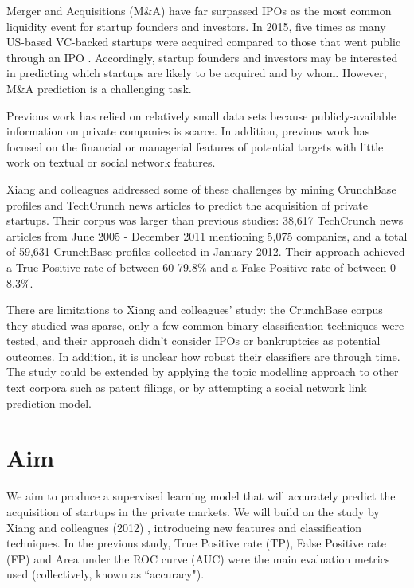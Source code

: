 \documentclass[12pt, a4paper]{article}
\begin{document}
Merger and Acquisitions (M\&A) have far surpassed IPOs as the most common liquidity event for startup founders and investors. In 2015, five times as many US-based VC-backed startups were acquired compared to those that went public through an IPO \cite{nvca2016}. Accordingly, startup founders and investors may be interested in predicting which startups are likely to be acquired and by whom. However, M\&A prediction is a challenging task.

Previous work has relied on relatively small data sets \cite{wei2008} because publicly-available information on private companies is scarce. In addition, previous work has focused on the financial or managerial features of potential targets \cite{hongjiu2007} with little work on textual or social network features.

Xiang and colleagues \cite{xiang2012} addressed some of these challenges by mining CrunchBase profiles and TechCrunch news articles to predict the acquisition of private startups. Their corpus was larger than previous studies: 38,617 TechCrunch news articles from June 2005 - December 2011 mentioning 5,075 companies, and a total of 59,631 CrunchBase profiles collected in January 2012. Their approach achieved a True Positive rate of between 60-79.8\% and a False Positive rate of between 0-8.3\%.

There are limitations to Xiang and colleagues' study: the CrunchBase corpus they studied was sparse, only a few common binary classification techniques were tested, and their approach didn't consider IPOs or bankruptcies as potential outcomes. In addition, it is unclear how robust their classifiers are through time. The study could be extended by applying the topic modelling approach to other text corpora such as patent filings, or by attempting a social network link prediction model.

\section*{Aim}

We aim to produce a supervised learning model that will accurately predict the acquisition of startups in the private markets. We will build on the study by Xiang and colleagues (2012) \cite{xiang2012}, introducing new features and classification techniques. In the previous study, True Positive rate (TP), False Positive rate (FP) and Area under the ROC curve (AUC) were the main evaluation metrics used (collectively, known as ``accuracy").
\end{document}

